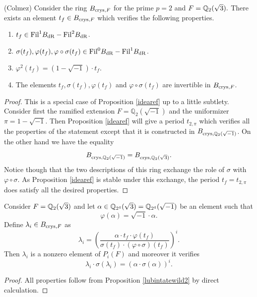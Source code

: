 \begin{prop}
\notready\label{lubintatewild2} (Colmez)
Consider the ring $B_{\textnormal{crys},F}$ for the prime $p=2$ and $F=\mathbb{Q}_2(\sqrt{3}).$
There  exists an element $t_{f} \in B_{\textnormal{crys},F}$ which verifies the following properties.
\begin{enumerate}
\item $t_{f} \in \textnormal{Fil} ^{1} B_{\mathrm{dR}}-\textnormal{Fil} ^{2} B_{\mathrm{dR}}$.
\item $\sigma (t_{f}) , \varphi (t_{f}) , \varphi \circ \sigma (t_{f}) \in \textnormal{Fil} ^{0} B_{\mathrm{dR}}-\textnormal{Fil} ^{1} B_{\mathrm{dR}}$.
\item  $ \varphi^2(t_{f}) = (1-\sqrt{-1})  \cdot t_{f}$.
\item The elements $t_{f}  ,  \sigma(t_{f} ), \varphi (t_{f} )$ and $ \varphi \circ \sigma (t_{f} )  $ are invertible in $B_{\textnormal{crys},F}$.
\end{enumerate}
\end{prop}
\begin{proof}
This is a special case of Proposition \ref{idearef} up to a little subtlety. Consider first the ramified extension $F=\mathbb{Q}_2(\sqrt{-1})$ and the uniformizer $\pi= 1-\sqrt{-1}. $ Then Proposition  \ref{idearef}  will give a period $t_{2,\pi}$ which verifies all the properties of the statement except that it is constructed in $B_{\textnormal{crys},\mathbb{Q}_2(\sqrt{-1})}$. On the other hand we have the equality \[B_{\textnormal{crys},\mathbb{Q}_2(\sqrt{-1})} = B_{\textnormal{crys},\mathbb{Q}_2(\sqrt{3})}.\]
Notice though that the two descriptions of this ring exchange the role of $ \sigma $ with $ \varphi \circ \sigma$. As  Proposition \ref{idearef}  is stable under this exchange, the period $t_f=t_{2,\pi}$ does satisfy all the desired properties.
\end{proof}
\begin{corollary}
\notready\label{brinonwild2}
  Consider $F=\mathbb{Q}_2(\sqrt{3})$ and let $\alpha \in \mathbb{Q}_{2^4}(\sqrt{3})=\mathbb{Q}_{2^4}(\sqrt{-1})$ be an element  such that
\[\varphi(\alpha) =  \sqrt{-1} \cdot \alpha.\]
Define $\lambda_i \in B_{\textnormal{crys},F}$ as
\[\lambda_i = \left(\frac{\alpha \cdot t_{f} \cdot \varphi(t_{f}) }{\sigma(t_{f})   \cdot (\varphi \circ \sigma) (t_{f})}\right)^i .\]
Then $\lambda_i$ is a nonzero element of  $P_{i}(F)$ and  moreover it verifies
\[\lambda_i \cdot\sigma(\lambda_i) = (\alpha  \cdot \sigma(\alpha))^i.\]
\end{corollary}
\begin{proof}
All properties follow from Proposition \ref{lubintatewild2}  by direct calculation.
\end{proof}
